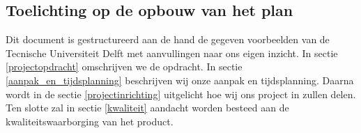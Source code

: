 \subsection{Toelichting op de opbouw van het plan}


Dit document is gestructureerd aan de hand de gegeven voorbeelden van de Tecnische Universiteit Delft met aanvullingen naar ons eigen inzicht.
In sectie \ref{projectopdracht} omschrijven we de opdracht.
In sectie \ref{aanpak_en_tijdsplanning} beschrijven wij onze aanpak en tijdsplanning.
Daarna wordt in de sectie \ref{projectinrichting} uitgelicht hoe wij ons project in zullen delen.
Ten slotte zal in sectie \ref{kwaliteit} aandacht worden besteed aan de kwaliteitswaarborging van het product.
\pagebreak